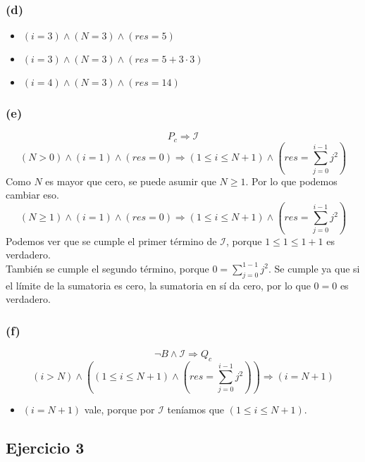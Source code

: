 \documentclass[12 pt]{article}
\begin{document}
    \subsubsection*{(d)}
        \begin{itemize}
            \item $(i=3) \wedge (N=3) \wedge (res=5)$
            \item $(i=3) \wedge (N=3) \wedge (res=5+3\cdot3)$
            \item $(i=4) \wedge (N=3) \wedge (res = 14)$
        \end{itemize}
    \subsubsection*{(e)}
        \[P_{c} \Rightarrow \mathcal{I}\]
        \[(N>0) \wedge (i=1) \wedge (res=0) \Rightarrow (1 \leq i \leq N+1) \wedge (res=\sum^{i-1}_{j=0}j^{2})\]
        Como $N$ es mayor que cero, se puede asumir que $N \geq 1$. Por lo que podemos cambiar eso.
        \[(N \geq 1) \wedge (i=1) \wedge (res=0) \Rightarrow (1 \leq i \leq N+1) \wedge (res=\sum^{i-1}_{j=0}j^{2})\]
        Podemos ver que se cumple el primer término de $\mathcal{I}$, porque $1 \leq 1 \leq 1+1$ es verdadero.
        \\
        También se cumple el segundo término, porque $0 = \sum^{1-1}_{j=0}j^{2}$. Se cumple ya que si el límite de la sumatoria es cero, la sumatoria en sí da cero, por lo que $0=0$ es verdadero.
    \subsubsection*{(f)}
        \[\neg B \wedge \mathcal{I} \Rightarrow Q_{c}\]
        \[(i > N) \wedge \left((1 \leq i \leq N+1) \wedge (res=\sum^{i-1}_{j=0}j^{2})\right) \Rightarrow (i=N+1)\]

        \begin{itemize}
            \item $(i=N+1)$ vale, porque por $\mathcal{I}$ teníamos que $(1 \leq i \leq N+1)$.
        \end{itemize}

\subsection*{Ejercicio 3}
\end{document}

